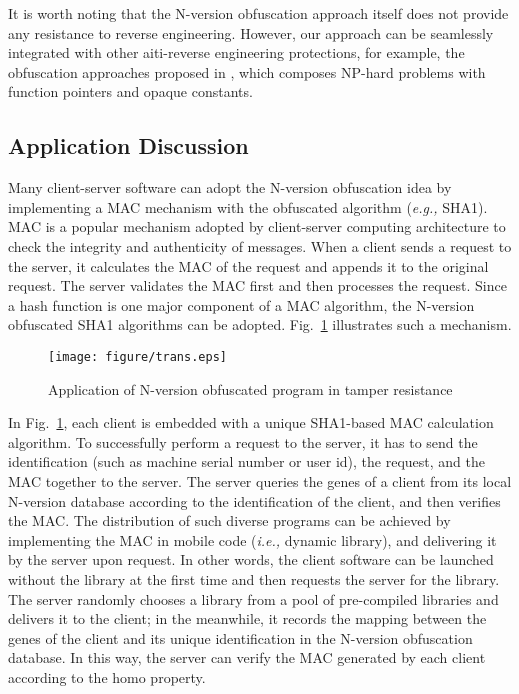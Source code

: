 \documentclass[10pt, conference]{IEEEtran}
\begin{document}
It is worth noting that the N-version obfuscation approach itself does not provide any resistance to reverse engineering.  However, our approach can be seamlessly integrated with other aiti-reverse engineering protections, for example, the obfuscation approaches proposed in \cite{ogiso2003software}, which composes NP-hard problems with function pointers and opaque constants.  

\subsection{Application Discussion} \label{section:application}

Many client-server software can adopt the N-version obfuscation idea by implementing a MAC mechanism with the obfuscated algorithm (\textit{e.g.,} SHA1).  MAC is a popular mechanism adopted by client-server computing architecture to check the integrity and authenticity of messages.  When a client sends a request to the server, it calculates the MAC of the request and appends it to the original request.  The server validates the MAC first and then processes the request.  Since a hash function is one major component of a MAC algorithm, the N-version obfuscated SHA1 algorithms can be adopted.  Fig.~\ref{fig:application} illustrates such a mechanism.  

\begin{figure}[t]
\centering
\texttt{[image: figure/trans.eps]}
\caption{Application of N-version obfuscated program in tamper resistance}
\label{fig:application}
\end{figure}

In Fig.~\ref{fig:application}, each client is embedded with a unique SHA1-based MAC calculation algorithm.  To successfully perform a request to the server, it has to send the identification (such as machine serial number or user id), the request, and the MAC together to the server.  The server queries the genes of a client from its local N-version database according to the identification of the client, and then verifies the MAC.  The distribution of such diverse programs can be achieved by implementing the MAC in mobile code (\textit{i.e.,} dynamic library), and delivering it by the server upon request.  In other words, the client software can be launched without the library at the first time and then requests the server for the library.  The server randomly chooses a library from a pool of pre-compiled libraries and delivers it to the client; in the meanwhile, it records the mapping between the genes of the client and its unique identification in the N-version obfuscation database.  In this way, the server can verify the MAC generated by each client according to the homo property.
\end{document}
